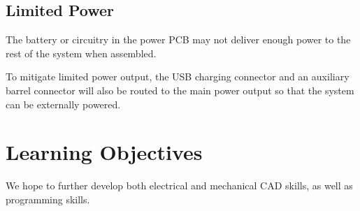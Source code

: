 \documentclass{notes}
\begin{document}
\subsection{Limited Power}

The battery or circuitry in the power PCB may not deliver enough power to the rest of the system when assembled.

To mitigate limited power output, the USB charging connector and an auxiliary barrel connector will also be routed to the main power output so that the system can be externally powered.

\section{Learning Objectives}

We hope to further develop both electrical and mechanical CAD skills, as well as programming skills.
\end{document}
